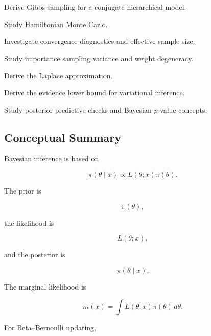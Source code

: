 \begin{exercise}[4]
Derive Gibbs sampling for a conjugate hierarchical model.
\end{exercise}

\begin{exercise}[4]
Study Hamiltonian Monte Carlo.
\end{exercise}

\begin{exercise}[4]
Investigate convergence diagnostics and effective sample size.
\end{exercise}

\begin{exercise}[4]
Study importance sampling variance and weight degeneracy.
\end{exercise}

\begin{exercise}[4]
Derive the Laplace approximation.
\end{exercise}

\begin{exercise}[4]
Derive the evidence lower bound for variational inference.
\end{exercise}

\begin{exercise}[4]
Study posterior predictive checks and Bayesian \(p\)-value concepts.
\end{exercise}

\subsection{Conceptual Summary}
\label{subsec:bayesian-summary}

Bayesian inference is based on

\[
\boxed{
\pi(\theta\mid x)
\propto
L(\theta;x)\pi(\theta).
}
\]

The prior is

\[
\boxed{
\pi(\theta),
}
\]

the likelihood is

\[
\boxed{
L(\theta;x),
}
\]

and the posterior is

\[
\boxed{
\pi(\theta\mid x).
}
\]

The marginal likelihood is

\[
\boxed{
m(x)
=
\int
L(\theta;x)
\pi(\theta)
\,d\theta.
}
\]

For Beta--Bernoulli updating,

